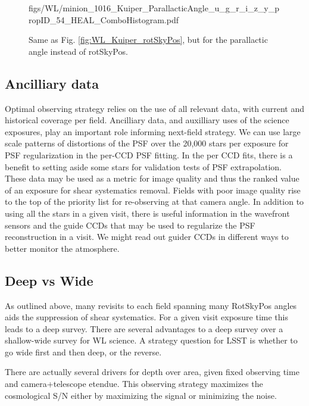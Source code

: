 \begin{figure}[tbh!]
        {figs/WL/minion_1016_Kuiper_ParallacticAngle_u_g_r_i_z_y_propID_54_HEAL_ComboHistogram.pdf}
\caption{Same as Fig. \ref{fig:WL_Kuiper_rotSkyPos}, but for the parallactic
    angle instead of rotSkyPos.}
\label{fig:WL_Kuiper_ParallacticAngle}
\end{figure}


\subsection{Ancilliary data}

Optimal observing strategy relies on the use of all relevant data, with current
and historical coverage per field.  Ancilliary data, and auxilliary uses of the
science exposures, play an important role informing next-field strategy.  We can
use large scale patterns of distortions of the PSF over the 20,000 stars per
exposure for PSF regularization in the per-CCD PSF fitting.  In the per CCD fits,
there is a benefit to setting aside some stars for validation tests of PSF
extrapolation.  These data may be used as a metric for image quality and thus
the ranked value of an exposure for shear systematics removal.  Fields with poor
image quality rise to the top of the priority list for re-observing at that
camera angle.  In addition to using all the stars in a given visit, there is
useful information in the wavefront sensors and the guide CCDs that may be used
to regularize the PSF reconstruction in a visit.  We might read out guider CCDs
in different ways to better monitor the atmosphere.


\subsection{Deep vs Wide}

As outlined above, many revisits to each field spanning many RotSkyPos angles
aids the suppression of shear systematics.  For a given visit exposure time
this leads to a deep survey.  There are several advantages to a deep survey over
a shallow-wide survey for WL science.  A strategy question for LSST is whether
to go wide first and then deep, or the reverse.

There are actually several drivers for depth over area, given fixed observing
time and camera+telescope etendue.  This observing strategy maximizes the
cosmological S/N either by maximizing the signal or minimizing the noise.

